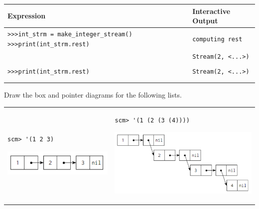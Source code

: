 \documentclass{exam}
\begin{document}
\begin{questions}
\begin{solution}
\begin{center}
    \begin{tabular}{|m{9cm}|m{6cm}|}
\hline
\textbf{Expression} & \textbf{Interactive Output} \\
\hline
\lstinline$>>>int_strm = make_integer_stream()$
 \lstinline$>>>print(int_strm.rest)$ & \color{red}\lstinline$computing rest$ \\
 & \color{red}\lstinline$Stream(2, <...>)$ \\ & \\
\hline
\lstinline$>>>print(int_strm.rest)$ & \color{red}\lstinline$Stream(2, <...>)$ \\ & \\ & \\
\hline
\end{tabular}
\end{center}
\end{solution}

\item Draw the box and pointer diagrams for the following lists.

\begin{tabular}{m{7cm} m{6cm}}
\begin{lstlisting}
scm> '(1 2 3)
\end{lstlisting}
\begin{solution}
\begin{center}
 \includegraphics[scale=0.7]{bp1}
\end{center}
\end{solution}
&
\begin{lstlisting}
scm> '(1 (2 (3 (4))))
\end{lstlisting}
\begin{solution}
\begin{center}
 \includegraphics[scale=0.7]{bp2}
\end{center}
\end{solution}
\end{tabular}
\end{questions}
\end{document}
